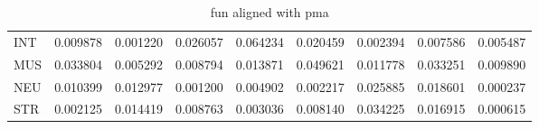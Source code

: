 \begin{table}[H]
\begin{center}
{\begin{tabular}{lrrrrrrrr}
INT & {\cellcolor[HTML]{FAFDC9}} \color[HTML]{000000} 0.009878 & {\cellcolor[HTML]{FEFFE2}} \color[HTML]{000000} 0.001220 & {\cellcolor[HTML]{E2F4AA}} \color[HTML]{000000} 0.026057 & {\cellcolor[HTML]{6DC073}} \color[HTML]{000000} 0.064234 & {\cellcolor[HTML]{EDF8B2}} \color[HTML]{000000} 0.020459 & {\cellcolor[HTML]{FEFFDF}} \color[HTML]{000000} 0.002394 & {\cellcolor[HTML]{FBFED0}} \color[HTML]{000000} 0.007586 & {\cellcolor[HTML]{FCFED6}} \color[HTML]{000000} 0.005487 \\
MUS & {\cellcolor[HTML]{D0EC9F}} \color[HTML]{000000} 0.033804 & {\cellcolor[HTML]{FCFED7}} \color[HTML]{000000} 0.005292 & {\cellcolor[HTML]{FAFDCC}} \color[HTML]{000000} 0.008794 & {\cellcolor[HTML]{F8FCBE}} \color[HTML]{000000} 0.013871 & {\cellcolor[HTML]{A1D889}} \color[HTML]{000000} 0.049621 & {\cellcolor[HTML]{F9FDC4}} \color[HTML]{000000} 0.011778 & {\cellcolor[HTML]{D2EDA0}} \color[HTML]{000000} 0.033251 & {\cellcolor[HTML]{FAFDC9}} \color[HTML]{000000} 0.009890 \\
NEU & {\cellcolor[HTML]{FAFDC8}} \color[HTML]{000000} 0.010399 & {\cellcolor[HTML]{F8FDC1}} \color[HTML]{000000} 0.012977 & {\cellcolor[HTML]{FEFFE2}} \color[HTML]{000000} 0.001200 & {\cellcolor[HTML]{FDFED9}} \color[HTML]{000000} 0.004902 & {\cellcolor[HTML]{FEFFDF}} \color[HTML]{000000} 0.002217 & {\cellcolor[HTML]{E3F4AA}} \color[HTML]{000000} 0.025885 & {\cellcolor[HTML]{F1FAB5}} \color[HTML]{000000} 0.018601 & {\cellcolor[HTML]{FFFFE5}} \color[HTML]{000000} 0.000237 \\
STR & {\cellcolor[HTML]{FEFFE1}} \color[HTML]{000000} 0.002125 & {\cellcolor[HTML]{F8FCBD}} \color[HTML]{000000} 0.014419 & {\cellcolor[HTML]{FBFDCE}} \color[HTML]{000000} 0.008763 & {\cellcolor[HTML]{FEFFDE}} \color[HTML]{000000} 0.003036 & {\cellcolor[HTML]{FBFDCF}} \color[HTML]{000000} 0.008140 & {\cellcolor[HTML]{CFEC9E}} \color[HTML]{000000} 0.034225 & {\cellcolor[HTML]{F4FBB7}} \color[HTML]{000000} 0.016915 & {\cellcolor[HTML]{FFFFE5}} \color[HTML]{000000} 0.000615 \\
\bottomrule
\end{tabular}
}\end{center}
\caption{fun aligned with pma}\end{table}